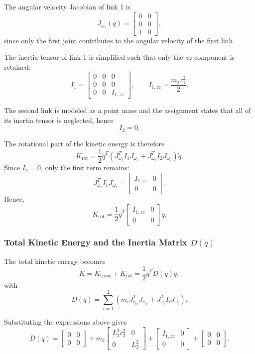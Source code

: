 \documentclass{article}
\begin{document}
The angular velocity Jacobian of link 1 is
\[
J_{\omega_1}(q)
=
\begin{bmatrix}
0 & 0\\
0 & 0\\
1 & 0
\end{bmatrix},
\]
since only the first joint contributes to the angular velocity of the first link.

The inertia tensor of link 1 is simplified such that only the \(zz\)-component is retained:
\[
I_1=
\begin{bmatrix}
0 & 0 & 0\\
0 & 0 & 0\\
0 & 0 & I_{1,zz}
\end{bmatrix},
\qquad
I_{1,zz}=\frac{m_1 r_1^2}{2}.
\]

The second link is modeled as a point mass and the assignment states that all of its inertia tensor is neglected, hence
\[
I_2 = 0.
\]

The rotational part of the kinetic energy is therefore
\[
K_{\mathrm{rot}}
=
\frac{1}{2}\dot q^T
\left(
J_{\omega_1}^T I_1 J_{\omega_1}
+
J_{\omega_2}^T I_2 J_{\omega_2}
\right)\dot q.
\]
Since \(I_2=0\), only the first term remains:
\[
J_{\omega_1}^T I_1 J_{\omega_1}
=
\begin{bmatrix}
I_{1,zz} & 0\\
0 & 0
\end{bmatrix}.
\]
Hence,
\[
K_{\mathrm{rot}}
=
\frac{1}{2}\dot q^T
\begin{bmatrix}
I_{1,zz} & 0\\
0 & 0
\end{bmatrix}
\dot q.
\]

\subsubsection*{Total Kinetic Energy and the Inertia Matrix \(D(q)\)}

The total kinetic energy becomes
\[
K
=
K_{\mathrm{trans}} + K_{\mathrm{rot}}
=
\frac{1}{2}\dot q^T D(q)\dot q,
\]
with
\[
D(q)
=
\sum_{i=1}^{2}
\left(
m_i J_{v_{ci}}^T J_{v_{ci}} + J_{\omega_i}^T I_i J_{\omega_i}
\right).
\]

Substituting the expressions above gives
\[
D(q)
=
\begin{bmatrix}
0 & 0\\
0 & 0
\end{bmatrix}
+
m_2
\begin{bmatrix}
L_2^2 c_2^2 & 0\\
0 & L_2^2
\end{bmatrix}
+
\begin{bmatrix}
I_{1,zz} & 0\\
0 & 0
\end{bmatrix}
+
\begin{bmatrix}
0 & 0\\
0 & 0
\end{bmatrix}.
\]
\end{document}
